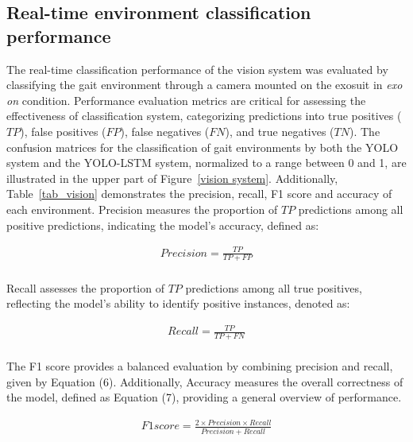\documentclass[journal,article,submit,pdftex,moreauthors]{Definitions/mdpi}
\begin{document}
\subsection{Real-time environment classification performance}
The real-time classification performance of the vision system was evaluated by classifying the gait environment through a camera mounted on the exosuit in \textit{exo on} condition. Performance evaluation metrics are critical for assessing the effectiveness of classification system, categorizing predictions into true positives ($TP$), false positives ($FP$), false negatives ($FN$), and true negatives ($TN$). The confusion matrices for the classification of gait environments by both the YOLO system and the YOLO-LSTM system, normalized to a range between 0 and 1, are illustrated in the upper part of Figure~\ref{vision system}. Additionally, Table~\ref{tab_vision} demonstrates the precision, recall, F1 score and accuracy of each environment. 
Precision measures the proportion of $TP$ predictions among all positive predictions, indicating the model's accuracy, defined as:
\begin{linenomath}
\begin{equation}
\begin{aligned}
\text{$Precision = \frac{TP}{TP+FP}$} \\
\end{aligned}
\end{equation}
\end{linenomath}

Recall assesses the proportion of $TP$ predictions among all true positives, reflecting the model's ability to identify positive instances, denoted as:
\begin{linenomath}
\begin{equation}
\begin{aligned}
\text{$Recall = \frac{TP}{TP+FN}$} \\
\end{aligned}
\end{equation}
\end{linenomath}
The F1 score provides a balanced evaluation by combining precision and recall, given by Equation (6). 
Additionally, Accuracy measures the overall correctness of the model, defined as Equation (7), providing a general overview of performance. 
\begin{linenomath}
\begin{equation}
\begin{aligned}
\text{$F1score = \frac{2\times Precision \times Recall}{Precision+Recall}$}
\end{aligned}
\end{equation}
\end{linenomath}
\end{document}
